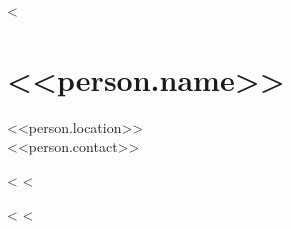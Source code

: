 <%



\section{<<person.name>>}
<<person.location>>\\
<<person.contact>>


\begin{paracol}{2}
\begin{leftcolumn}
<%
<%
\end{leftcolumn}

\begin{rightcolumn}
<%
<%
\end{rightcolumn}
\end{paracol}

